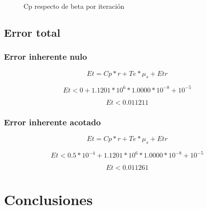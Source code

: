 \documentclass[11pt,a4paper]{article}
\begin{document}
\begin{figure}[H]
	\caption{Cp respecto de beta por iteración}
	\label{fig:cpsb}
\end{figure}

\subsection{Error total}

\subsubsection{Error inherente nulo}

\[ Et = Cp * r + Te * \mu_s + Etr \]

\[ Et < 0 + 1.1201*10^6 * 1.0000*10^{-8} + 10^{-5} \]

\[ Et < 0.011211\]

\subsubsection{Error inherente acotado}

\[ Et = Cp * r + Te * \mu_s + Etr \]

\[ Et < 0.5*10^{-4} + 1.1201*10^6 * 1.0000*10^{-8} + 10^{-5} \]

\[ Et < 0.011261\]

\section{Conclusiones}
\end{document}
